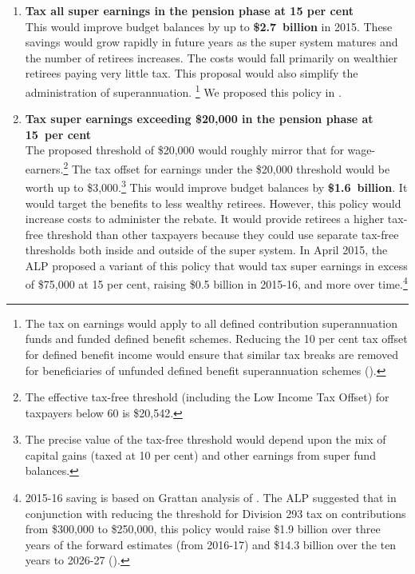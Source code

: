 \begin{enumerate}
\item \textbf{Tax all super earnings in the pension phase at 15 per cent}\\  
This would improve budget balances by up to \textbf{\$2.7~billion} in 2015. These savings would grow rapidly in future years as the super system matures and the number of retirees increases. The costs would fall primarily on wealthier retirees paying very little tax. This proposal would also simplify the administration of superannuation.%
\footnote{The tax on earnings would apply to all defined contribution superannuation funds and funded defined benefit schemes. Reducing the 10 per cent tax offset for defined benefit income would ensure that similar tax breaks are removed for beneficiaries of unfunded defined benefit superannuation schemes (\textcite{ALP2015FairerSuper}).}  We proposed this policy in . 
%
\item \textbf{Tax super earnings exceeding \$20,000 in the pension phase at 15~per cent}\\ 
The proposed threshold of \$20,000 would roughly mirror that for wage-earners.\footnote{The effective tax-free threshold (including the Low Income Tax Offset) for taxpayers below 60 is \$20,542.}  The tax offset for earnings under the \$20,000 threshold would be worth up to \$3,000.\footnote{The precise value of the tax-free threshold would depend upon the mix of capital gains (taxed at 10 per cent) and other earnings from super fund balances.}  This would improve budget balances by \textbf{\$1.6~billion}. It would target the benefits to less wealthy retirees. However, this policy would increase costs to administer the rebate. It would provide retirees a higher tax-free threshold than other taxpayers because they could use separate tax-free thresholds both inside and outside of the super system. In April 2015, the ALP proposed a variant of this policy that would tax super earnings in excess of \$75,000 at 15 per cent, raising \$0.5 billion in 2015-16, and more over time.\footnote{2015-16 saving is based on Grattan analysis of \textcite{ABS2013t}. The ALP suggested that in conjunction with reducing the threshold for Division 293 tax on contributions from \$300,000 to \$250,000, this policy would raise \$1.9 billion over three years of the forward estimates (from 2016-17) and \$14.3 billion over the ten years to 2026-27 (\textcite{ALP2015FairerSuper}).}

\end{enumerate}
